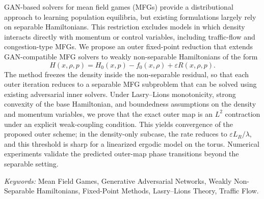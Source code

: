 GAN-based solvers for mean field games (MFGs) provide a distributional approach
to learning population equilibria, but existing formulations largely rely on
separable Hamiltonians. This restriction excludes models in which density
interacts directly with momentum or control variables, including traffic-flow
and congestion-type MFGs. We propose an outer fixed-point reduction that
extends GAN-compatible MFG solvers to weakly non-separable Hamiltonians of the
form
\[
  H(x,\rho,p)=H_0(x,p)-f_0(x,\rho)+\varepsilon R(x,\rho,p).
\]
The method freezes the density inside the non-separable residual, so that each
outer iteration reduces to a separable MFG subproblem that can be solved using
existing adversarial inner solvers. Under Lasry--Lions monotonicity, strong
convexity of the base Hamiltonian, and boundedness assumptions on the density
and momentum variables, we prove that the exact outer map is an $L^2$
contraction under an explicit weak-coupling condition. This yields convergence
of the proposed outer scheme; in the density-only subcase, the rate reduces to
$\varepsilon L_R/\lambda$, and this threshold is sharp for a linearized
ergodic model on the torus. Numerical experiments validate the predicted
outer-map phase transitions beyond the separable setting.

\smallskip
\noindent\textit{Keywords:} Mean Field Games, Generative Adversarial Networks,
Weakly Non-Separable Hamiltonians, Fixed-Point Methods, Lasry--Lions Theory,
Traffic Flow.

